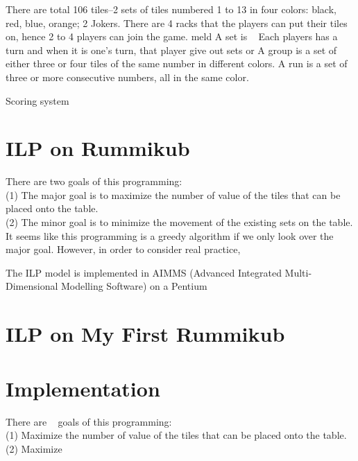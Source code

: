\documentclass[11pt]{article}
\begin{document}
	
	There are total 106 tiles--2 sets of tiles numbered 1 to 13 in four colors: black, red, blue, orange; 2 Jokers. There are 4 racks that the players can put their tiles on, hence 2 to 4 players can join the game.
	meld
	A set is ~
	Each players has a turn and when it is one's turn, that player give out sets or 
	A group is a set of either three or four tiles of the same number in different colors.
	A run is a set of three or more consecutive numbers, all in the same color.
	
	Scoring system

	
	
	\section{ILP on Rummikub}\label{section-ILP imp}
	
	There are two goals of this programming:\\
	(1) The major goal is to maximize the number of value of the tiles that can be placed onto the table.\\
	(2) The minor goal is to minimize the movement of the existing sets on the table.\\
	It seems like this programming is a greedy algorithm if we only look over the major goal. However, in order to consider real practice, 
	
	
	
	The ILP model is implemented in AIMMS (Advanced Integrated Multi-Dimensional Modelling Software) on a Pentium %
	
	




	\section{ILP on My First Rummikub}\label{section-ILP MFR}



	\section{Implementation}\label{section-imp}
	
	There are ~ goals of this programming:\\
	(1) Maximize the number of value of the tiles that can be placed onto the table.\\
	(2) Maximize 
	
	
	
	
	
	
	
	
\end{document}
